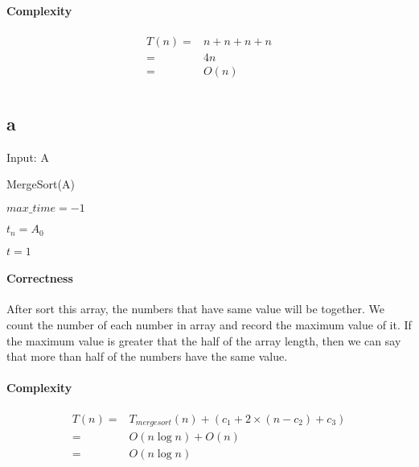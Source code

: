 \documentclass{article}
\begin{document}
    \paragraph{Complexity} 
    \begin{equation}
        \begin{split}
            T(n)=&n+n+n+n\\
                =&4n\\
                =&O(n)
        \end{split}
    \end{equation}
    \section{}
    \subsection*{a}
    \begin{algorithm}[H]
        Input: A

        MergeSort(A)

        $max\_time=-1$

        $t_n=A_0$

        $t=1$


    \end{algorithm}
    \paragraph{Correctness}
    After sort this array, the numbers that have same value will be together.  We count the number of each number in array and record the maximum value of it. If the maximum value is greater that the half of the array length, then we can say that more than half of the numbers have the same value. 
    \paragraph{Complexity}
    \begin{equation}
        \begin{split}
            T(n)=&T_{merge sort}(n)+(c_1+2\times(n-c_2)+c_3)\\
                =&O(n\log n)+O(n)\\
                =&O(n\log n)
        \end{split}
    \end{equation}
    \newpage
\end{document}
